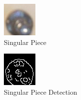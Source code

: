 \documentclass[journal]{IEEEtran}
\begin{document}
\begin{figure}[!ht]
	\centering
	\includegraphics[width=\linewidth]{Images/Piece_zoomed.jpg}
	\caption{Singular Piece}
	\label{piece zoomed}
\end{figure}

\begin{figure}[!ht]
	\centering
	\includegraphics[width=\linewidth]{Images/PieceDetection_zoomed.jpg}
	\caption{Singular Piece Detection}
	\label{piece detection zoomed}
\end{figure}
\end{document}
